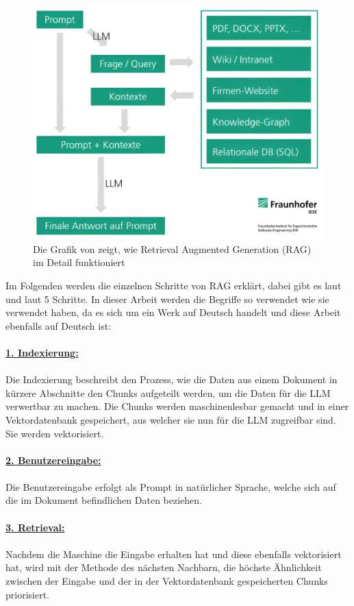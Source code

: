 \documentclass[12pt,toc=bib,toc=listof]{scrreprt}
\begin{document}
\begin{figure} [H]
    \centering
    \includegraphics[width=0.75\linewidth]{./Bilder/Honroth_Wie funktioniert Retrieval Augmented Generation (RAG) im Detail.png}
    \caption{Die Grafik von \textcite{Honroth2024} zeigt, wie Retrieval Augmented Generation (RAG) im Detail funktioniert}
    \label{fig:enter-label}
\end{figure}
\noindent Im Folgenden werden die einzelnen Schritte von RAG erklärt, dabei gibt es laut \textcite{Schmid2024} und laut \textcite{Miesle2023} 5 Schritte. In dieser Arbeit werden die Begriffe so verwendet wie sie \textcite{Schmid2024} verwendet haben, da es sich um ein Werk auf Deutsch handelt und diese Arbeit ebenfalls auf Deutsch ist:\\
\\
\textbf{\underline{1. Indexierung:}}\\
\\
Die Indexierung beschreibt den Prozess, wie die Daten aus einem Dokument in kürzere Abschnitte den Chunks aufgeteilt werden, um die Daten für die LLM verwertbar zu machen. Die Chunks werden maschinenlesbar gemacht und in einer Vektordatenbank gespeichert, aus welcher sie nun für die LLM zugreifbar sind. Sie werden vektorisiert.\\
\\
\textbf{\underline{2. Benutzereingabe:}}\\
\\
Die Benutzereingabe erfolgt als Prompt in natürlicher Sprache, welche sich auf die im Dokument befindlichen Daten beziehen.\\
\\
\textbf{\underline{3. Retrieval:}}\\
\\
Nachdem die Maschine die Eingabe erhalten hat und diese ebenfalls vektorisiert hat, wird mit der Methode des nächsten Nachbarn, die höchste Ähnlichkeit zwischen der Eingabe und der in der Vektordatenbank gespeicherten Chunks priorisiert.\\
\end{document}
